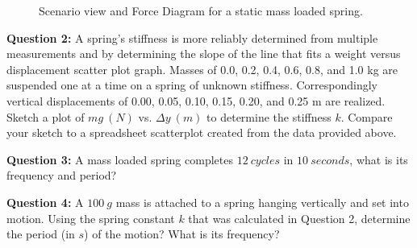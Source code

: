 \documentclass[14pt]{article}
\begin{document}
\begin{figure}[h]
\caption{Scenario view and Force Diagram for a static mass loaded spring.} \label{fig:figure1}
\end{figure}

\vskip 5pt

{\bf Question 2:} A spring's stiffness is more reliably determined from multiple measurements and by determining the slope of the line that fits a weight versus displacement scatter plot graph. Masses of 0.0, 0.2, 0.4, 0.6, 0.8, and 1.0 kg are suspended one at a time on a spring of unknown stiffness. Correspondingly vertical displacements of 0.00, 0.05, 0.10, 0.15, 0.20, and 0.25 m are realized. Sketch a plot of $mg~(N)$ vs. $\Delta y~(m)$ to determine the stiffness $k$.  Compare your sketch to a spreadsheet scatterplot created from the data provided above.

\vskip 80pt

{\bf Question 3:} A mass loaded spring completes $12~cycles$ in $10~seconds$, what is its frequency and period?\vskip 60pt

{\bf Question 4:} A $100~g$ mass is attached to a spring hanging vertically and set into motion. Using the spring constant $k$ that was calculated in Question 2, determine the period (in $s$) of the motion? What is its frequency?\vskip 0pt
\end{document}
